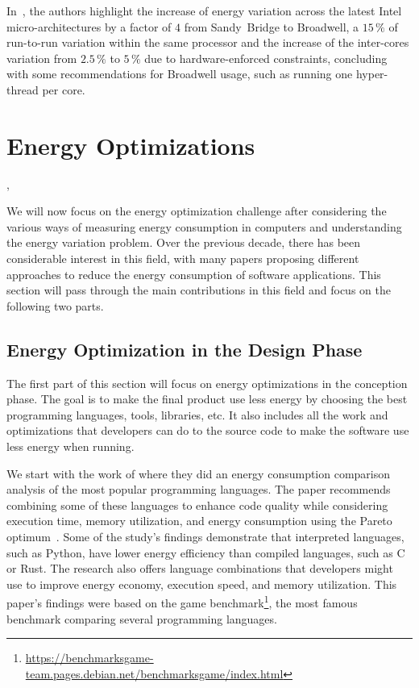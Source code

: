 In~\cite{marathe_empirical_2017_m}, the authors highlight the increase of energy variation across the latest Intel micro-architectures by a factor of $4$ from Sandy~Bridge to Broadwell, a $15\,\%$ of run-to-run variation within the same processor and the increase of the inter-cores variation from $2.5\,\%$ to $5\,\%$ due to hardware-enforced constraints, concluding with some recommendations for Broadwell usage, such as running one hyper-thread per core.

\section{Energy Optimizations}\label{section:soa_energyoptimization},

We will now focus on the energy optimization challenge after considering the various ways of measuring energy consumption in computers and understanding the energy variation problem.
Over the previous decade, there has been considerable interest in this field, with many papers proposing different approaches to reduce the energy consumption of software applications. This section will pass through the main contributions in this field and focus on the following two parts.

\subsection{Energy Optimization in the Design Phase}
The first part of this section will focus on energy optimizations in the conception phase. The goal is to make the final product use less energy by choosing the best programming languages, tools, libraries, etc. It also includes all the work and optimizations that developers can do to the source code to make the software use less energy when running.

We start with the work of \citeauthor{pereira_energy_2017} where they did an energy consumption comparison analysis of the most popular programming languages.
The paper recommends combining some of these languages to enhance code quality while considering execution time, memory utilization, and energy consumption using the Pareto optimum~\cite{hochman1969pareto}. Some of the study's findings demonstrate that interpreted languages, such as Python, have lower energy efficiency than compiled languages, such as C or Rust. The research also offers language combinations that developers might use to improve energy economy, execution speed, and memory utilization.
This paper's findings were based on the game benchmark\footnote{\url{https://benchmarksgame-team.pages.debian.net/benchmarksgame/index.html}}, the most famous benchmark comparing several programming languages.

